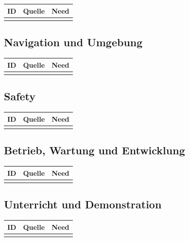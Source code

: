 \begin{longtable}{L{0.18\textwidth} L{0.16\textwidth} L{0.50\textwidth}}
\toprule
ID & Quelle & Need \\
\midrule
{}
\bottomrule
\end{longtable}

\subsection{Navigation und Umgebung}

\begin{longtable}{L{0.18\textwidth} L{0.16\textwidth} L{0.50\textwidth}}
\toprule
ID & Quelle & Need \\
\midrule
{}
\bottomrule
\end{longtable}

\subsection{Safety}

\begin{longtable}{L{0.18\textwidth} L{0.16\textwidth} L{0.50\textwidth}}
\toprule
ID & Quelle & Need \\
\midrule
{}
\bottomrule
\end{longtable}

\subsection{Betrieb, Wartung und Entwicklung}

\begin{longtable}{L{0.18\textwidth} L{0.16\textwidth} L{0.50\textwidth}}
\toprule
ID & Quelle & Need \\
\midrule
{}
\bottomrule
\end{longtable}

\subsection{Unterricht und Demonstration}

\begin{longtable}{L{0.18\textwidth} L{0.16\textwidth} L{0.50\textwidth}}
\toprule
ID & Quelle & Need \\
\midrule
{}
\bottomrule
\end{longtable}
